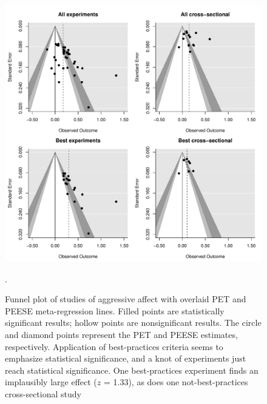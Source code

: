 \documentclass[man, mask]{apa6}
\begin{document}
\begin{figure}
	\includegraphics[width = \textwidth, keepaspectratio]{funnels-0_AggAff.pdf}
	\caption{Funnel plot of studies of aggressive affect with overlaid PET and PEESE meta-regression lines. Filled points are statistically significant results; hollow points are nonsignificant results. The circle and diamond points represent the PET and PEESE estimates, respectively. Application of best-practices criteria seems to emphasize statistical significance, and a knot of experiments just reach statistical significance. One best-practices experiment \citep{Ballard:Wiest:1996} finds an implausibly large effect ($z$ = 1.33), as does one not-best-practices cross-sectional study \citep[$z$ = 0.60]{Urashima:Suzuki:2003}}.
	\label{funnel-aggaff}
\end{figure}
\end{document}
